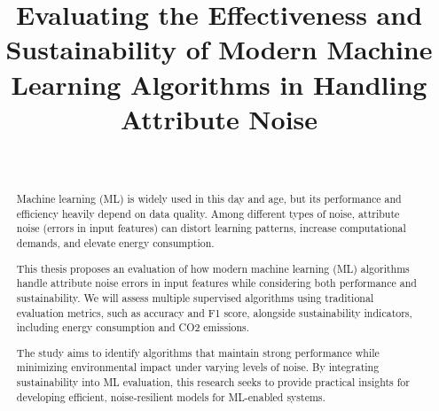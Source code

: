 \documentclass[conference]{IEEEtran}
\begin{document}
\title{Evaluating the Effectiveness and Sustainability of Modern Machine Learning Algorithms in Handling Attribute Noise}

\author{
 \\
}

\maketitle

\begin{abstract}
Machine learning (ML) is widely used in this day and age, but its performance and efficiency heavily depend on data quality. Among different types of noise, attribute noise (errors in input features) can distort learning patterns, increase computational demands, and elevate energy consumption.

This thesis proposes an evaluation of how modern machine learning (ML) algorithms handle attribute noise errors in input features while considering both performance and sustainability. We will assess multiple supervised algorithms using traditional evaluation metrics, such as accuracy and F1 score, alongside sustainability indicators, including energy consumption and CO2 emissions.
    
The study aims to identify algorithms that maintain strong performance while minimizing environmental impact under varying levels of noise. By integrating sustainability into ML evaluation, this research seeks to provide practical insights for developing efficient, noise-resilient models for ML-enabled systems.
\end{abstract}


\end{document}
